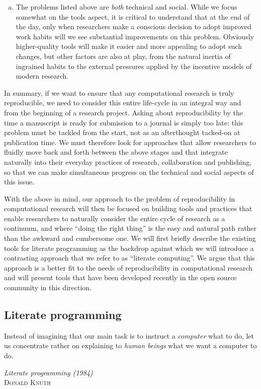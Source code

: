 \documentclass[ChapterTOCs,krantz2]{krantz} %
\begin{document}
\begin{enumerate}[(a)]
\item The problems listed above are \emph{both} technical and social.  While we
  focus somewhat on the tools aspect, it is critical to understand that at the
  end of the day, only when researchers make a conscious decision to adopt
  improved work habits will we see substantial improvements on this problem.
  Obviously higher-quality tools will make it easier and more appealing to
  adopt such changes, but other factors are also at play, from the natural
  inertia of ingrained habits to the external pressures applied by the
  incentive models of modern research.
\end{enumerate}

In summary, if we want to ensure that any computational research is truly
reproducible, we need to consider this entire life-cycle in an integral way and
from the beginning of a research project.  Asking about reproducibility by the
time a manuscript is ready for submission to a journal is simply too late: this
problem must be tackled from the start, not as an afterthought tacked-on at
publication time.  We must therefore look for approaches that allow researchers
to fluidly move back and forth between the above stages and that integrate
naturally into their everyday practices of research, collaboration and
publishing, so that we can make simultaneous progress on the technical and
social aspects of this issue.

With the above in mind, our approach to the problem of reproducibility in
computational research will then be focused on building tools and practices
that enable researchers to naturally consider the entire cycle of research as a
continuum, and where ``doing the right thing'' is the easy and natural path
rather than the awkward and cumbersome one.  We will first briefly describe the
existing tools for literate programming as the backdrop against which we will
introduce a contrasting approach that we refer to as ``literate computing''.
We argue that this approach is a better fit to the needs of reproducibility in
computational research and will present tools that have been developed recently
in the open source community in this direction.

\subsection{Literate programming}


\setlength{\epigraphrule}{0pt}
\setlength{\epigraphwidth}{.90\textwidth}
\epigraph%
{%
Instead of imagining that our main task is to instruct a \emph{computer}
what to do, let us concentrate rather on explaining to \emph{human beings}
what we want a computer to do.
}%
{\textit{Literate programming (1984)}\\ \textsc{Donald Knuth} }
\end{document}
